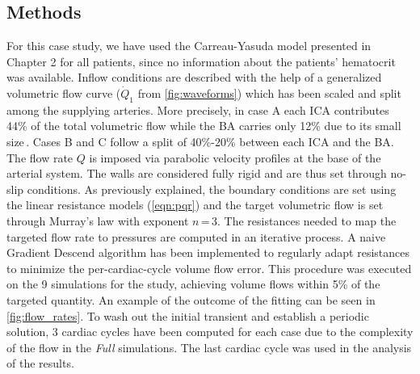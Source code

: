 \subsection{Methods}
For this case study, we have used the Carreau-Yasuda model presented in Chapter 2 for all patients, since no information about the patients' hematocrit was available. Inflow conditions are described with the help of a generalized volumetric flow curve ($\dot{Q}_1$ from \autoref{fig:waveforms}) which has been scaled and split among the supplying arteries. More precisely, in case A each ICA contributes 44\% of the total volumetric flow while the BA carries only 12\% due to its small size\,\cite{Tanaka2006}. Cases B and C follow a split of 40\%-20\% between each ICA and the BA\@. The flow rate $Q$ is imposed via parabolic velocity profiles at the base of the arterial system. The walls are considered fully rigid and are thus set through no-slip conditions. As previously explained, the boundary conditions are set using the linear resistance models (\autoref{eqn:pqr}) and the target volumetric flow is set through Murray's law with exponent $n$\,=\,3. The resistances needed to map the targeted flow rate to pressures are computed in an iterative process. A naive Gradient Descend algorithm has been implemented to regularly adapt resistances to minimize the per-cardiac-cycle volume flow error. This procedure was executed on the 9 simulations for the study, achieving volume flows within 5\% of the targeted quantity. An example of the outcome of the fitting can be seen in \autoref{fig:flow_rates}. To wash out the initial transient and establish a periodic solution, 3 cardiac cycles have been computed for each case due to the complexity of the flow in the \textit{Full} simulations. The last cardiac cycle was used in the analysis of the results.
